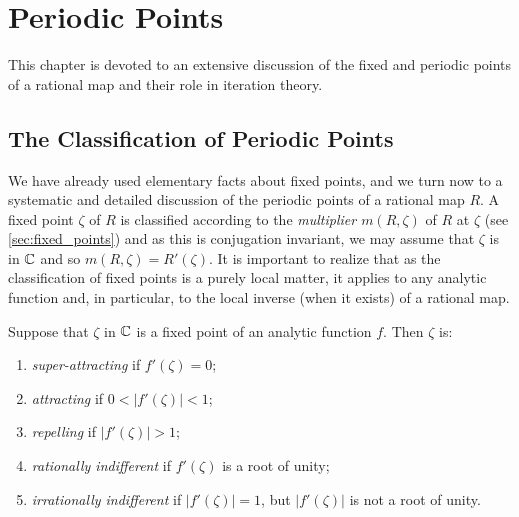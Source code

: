 \chapter{Periodic Points}
\label{chp:periodic_points}

This chapter is devoted to an extensive discussion of the fixed and periodic
points of a rational map and their role in iteration theory.

\section{The Classification of Periodic Points}
\label{sec:the_classification_of_periodic_points}

We have already used elementary facts about fixed points, and we turn now to a
systematic and detailed discussion of the periodic points of a rational map $R$.
A fixed point $\zeta$ of $R$ is classified according to the \emph{multiplier
$m(R, \zeta)$} of $R$ at $\zeta$ (see \ref{sec:fixed_points}) and as this is
conjugation invariant, we may assume that $\zeta$ is in $\mathbb{C}$ and so $m(R, \zeta)
= R'(\zeta)$. It is important to realize that as the classification of fixed
points is a purely local matter, it applies to any analytic function and, in
particular, to the local inverse (when it exists) of a rational map.

\begin{definition}
    Suppose that $\zeta$ in $\mathbb{C}$ is a fixed point of an analytic function $f$.
    Then $\zeta$ is:
    \begin{enumerate}[label=(\alph*)]
        \item \label{itm:supper_attracting_fixed_point} \emph{super-attracting}
        if $f'(\zeta) = 0$;
        \item \label{itm:attracting_fixed_point} \emph{attracting} if $0 <
        |f'(\zeta)| < 1$;
        \item \label{itm:repelling_fixed_point} \emph{repelling} if $|f'(\zeta)|
        > 1$;
        \item \label{itm:rationally_indifferent_fixed_point} \emph{rationally
        indifferent} if $f'(\zeta)$ is a root of unity;
        \item \label{itm:irrationally_indifferent_fixed_point}
        \emph{irrationally indifferent} if $|f'(\zeta)| = 1$, but $|f'(\zeta)|$
        is not a root of unity.
    \end{enumerate}
\end{definition}

